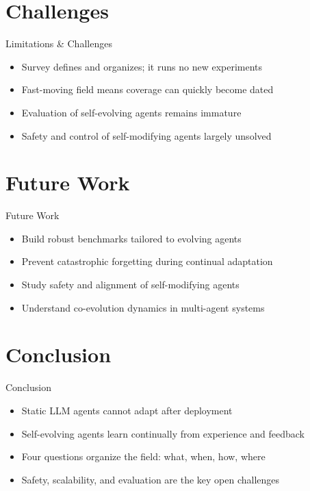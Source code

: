 \documentclass[10pt]{beamer}
\begin{document}
\section{Challenges}
\begin{frame}{Limitations \& Challenges}
\begin{itemize}
  \item Survey defines and organizes; it runs no new experiments
  \item Fast-moving field means coverage can quickly become dated
  \item Evaluation of self-evolving agents remains immature
  \item Safety and control of self-modifying agents largely unsolved
\end{itemize}
\end{frame}

\section{Future Work}
\begin{frame}{Future Work}
\begin{itemize}
  \item Build robust benchmarks tailored to evolving agents
  \item Prevent catastrophic forgetting during continual adaptation
  \item Study safety and alignment of self-modifying agents
  \item Understand co-evolution dynamics in multi-agent systems
\end{itemize}
\end{frame}

\section{Conclusion}
\begin{frame}{Conclusion}
\begin{itemize}
  \item Static LLM agents cannot adapt after deployment
  \item Self-evolving agents learn continually from experience and feedback
  \item Four questions organize the field: what, when, how, where
  \item Safety, scalability, and evaluation are the key open challenges
\end{itemize}
\end{frame}
\end{document}
